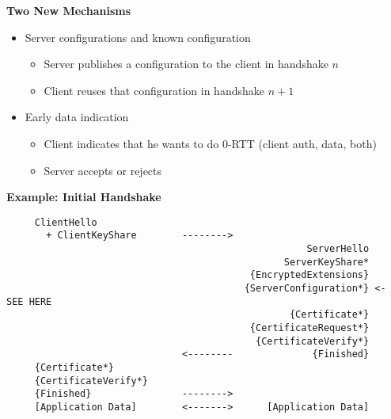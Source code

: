\documentclass[helvetica]{seminar}
\newcommand{\heading}[1]{%
  \begin{center} 
    \large\bf 
    #1 
  \end{center} 
  \vspace{.4 in}}
\begin{document}
\begin{slide}
\heading{Two New Mechanisms}

\begin{itemize}
\item Server configurations and known configuration
  \begin{itemize}
  \item Server publishes a configuration to the client in handshake $n$
  \item Client reuses that configuration in handshake $n+1$
  \end{itemize}

\item Early data indication
  \begin{itemize}
  \item Client indicates that he wants to do 0-RTT (client auth, data, both)
  \item Server accepts or rejects
  \end{itemize}
\end{itemize}

\end{slide}
\begin{slide}
\heading{Example: Initial Handshake}

\vspace{-2ex}
\begin{footnotesize}
\begin{verbatim}
     ClientHello
       + ClientKeyShare        -------->
                                                     ServerHello
                                                 ServerKeyShare*
                                           {EncryptedExtensions}
                                          {ServerConfiguration*} <- SEE HERE
                                                  {Certificate*}
                                           {CertificateRequest*}
                                            {CertificateVerify*}
                               <--------              {Finished}
     {Certificate*}
     {CertificateVerify*}
     {Finished}                -------->
     [Application Data]        <------->      [Application Data]
\end{verbatim}
\end{footnotesize}
\end{slide}
\end{document}

